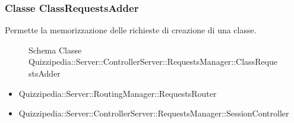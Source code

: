\subsubsection{Classe ClassRequestsAdder}
Permette la memorizzazione delle richieste di creazione di una classe.
\begin{figure}[H]
\centering
\noindent{}
\caption{Schema Classe Quizzipedia::Server::ControllerServer::RequestsManager::ClassRequestsAdder}
\end{figure}
\begin{itemize}
\item Quizzipedia::Server::RoutingManager::RequestsRouter
\end{itemize}
\begin{itemize}
\item Quizzipedia::Server::ControllerServer::RequestsManager::SessionController
\end{itemize}
